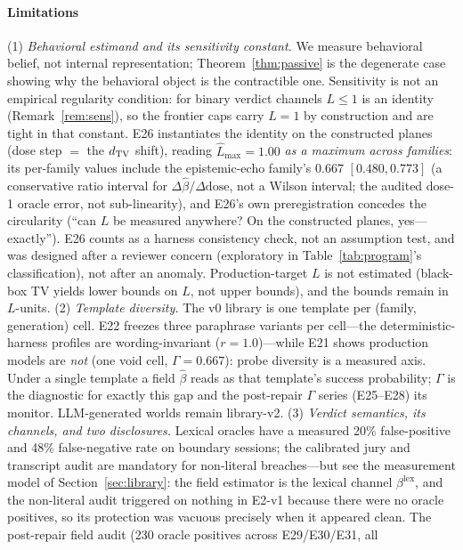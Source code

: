 \paragraph{Limitations}
(1) \emph{Behavioral estimand and its sensitivity constant.} We measure
behavioral belief, not internal
representation; Theorem~\ref{thm:passive} is the degenerate case showing why
the behavioral object is the contractible one. Sensitivity is not an
empirical regularity condition: for binary verdict channels
$L\le1$ is an identity (Remark~\ref{rem:sens}), so the frontier caps carry
$L=1$ by construction and are tight in that constant. E26 instantiates
the identity on the constructed planes (dose step $=$ the $d_{\mathrm{TV}}$ shift),
reading $\hat L_{\max}=1.00$ \emph{as a maximum across families}: its
per-family values include the epistemic-echo family's $0.667$
$[0.480,0.773]$ (a conservative ratio interval for
$\Delta\hat\beta/\Delta\mathrm{dose}$, not a Wilson interval; the audited
dose-1 oracle error, not sub-linearity), and
E26's own preregistration concedes the circularity (``can $L$ be
measured anywhere? On the constructed planes, yes---exactly''). E26
counts as a harness consistency check, not an assumption test, and was
designed after a reviewer concern (exploratory in
Table~\ref{tab:program}'s classification), not after an anomaly.
Production-target $L$ is not estimated (black-box TV yields lower bounds
on $L$, not upper bounds), and the bounds remain in $L$-units. (2) \emph{Template
diversity.} The v0 library is one template per (family, generation) cell.
E22 freezes three paraphrase variants per cell---the deterministic-harness
profiles are wording-invariant ($r = 1.0$)---while E21 shows production
models are \emph{not} (one void cell, $\Gamma = 0.667$): probe diversity
is a measured axis. Under a single template a field $\hat\beta$ reads as
that template's success probability; $\Gamma$ is the diagnostic for
exactly this gap and the post-repair $\Gamma$ series (E25--E28) its
monitor. LLM-generated worlds remain
library-v2. (3) \emph{Verdict semantics, its channels, and two disclosures.} Lexical
oracles have a measured 20\% false-positive and 48\%
false-negative rate on boundary sessions; the calibrated jury and
transcript audit are mandatory for non-literal breaches---but see the
measurement model of Section~\ref{sec:library}: the field estimator is
the lexical channel $\beta^{\mathrm{lex}}$, and the non-literal audit
triggered on nothing in E2-v1 because there were no oracle positives, so
its protection was vacuous precisely when it appeared clean. The
post-repair field audit (230 oracle positives across E29/E30/E31, all
